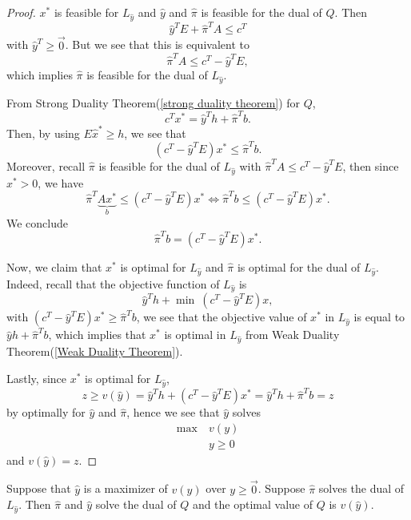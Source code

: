 \begin{proof}
	\(x^{*}\) is feasible for \(L_{\hat{y}}\) and \(\hat{y}\) and \(\hat{\pi}\) is feasible for the dual of \(Q\). Then
	\[
		\hat{y}^{T}E + \hat{\pi}^{T}A \leq c^{T}
	\]
	with \(\hat{y}^{T}\geq \vec{0}\). But we see that this is equivalent to
	\[
		\hat{\pi}^{T}A\leq c^{T} - \hat{y}^{T}E,
	\]
	which implies \(\hat{\pi}\) is feasible for the dual of \(L_{\hat{y}}\).

	From Strong Duality Theorem(\autoref{strong duality theorem}) for \(Q\),
	\[
		c^{T}x^{*} = \hat{y}^{T}h + \hat{\pi}^{T}b.
	\]
	Then, by using \(E \hat{x}^{*} \geq h\), we see that
	\[
		(c^{T} - \hat{y}^{T}E)x^{*} \leq \hat{\pi}^{T}b.
	\]
	Moreover, recall \(\hat{\pi}\) is feasible for the dual of \(L_{\hat{y}}\) with \(\hat{\pi}^{T} A \leq c^{T} - \hat{y}^{T}E\), then since \(x^{*}>0\), we have
	\[
		\hat{\pi}^{T} \underbrace{Ax^{*}}_{b} \leq (c^{T} - \hat{y}^{T}E)x^{*} \iff \hat{\pi}^{T} b \leq (c^{T} - \hat{y}^{T}E)x^{*}.
	\]
	We conclude
	\[
		\hat{\pi}^{T} b = (c^{T} - \hat{y}^{T}E)x^{*}.
	\]

	Now, we claim that \(x^{*}\) is optimal for \(L_{\hat{y}}\) and \(\hat{\pi}\) is optimal for the dual of \(L_{\hat{y}}\).
	Indeed, recall that the objective function of \(L_{\hat{y}}\) is
	\[
		\hat{y}^{T}h + \min~  (c^{T} - \hat{y}^{T}E)x,
	\]
	with \((c^{T} - \hat{y}^{T}E)x^{*} \geq \hat{\pi}^{T}b\), we see that the objective value of \(x^{*}\) in \(L_{\hat{y}}\)
	is equal to \(\hat{y}h+\hat{\pi}^{T}b \), which implies that \(x^{*}\) is optimal in \(L_{\hat{y}}\) from Weak Duality Theorem(\autoref{Weak Duality Theorem}).

	Lastly, since \(x^{*}\) is optimal for \(L_{\hat{y}}\),
	\[
		z\geq v(\hat{y})= \hat{y}^{T}h + (c^{T} - \hat{y}^{T}E)x^{*}= \hat{y}^{T}h + \hat{\pi}^{T}b = z
	\]
	by optimally for \(\hat{y}\) and \(\hat{\pi}\), hence we see that \(\hat{y}\) solves
	\begin{align*}
		\max~ & v(y)    \\
		      & y\geq 0
	\end{align*}
	and \(v(\hat{y}) = z\).
\end{proof}

\begin{theorem}
	\label{converse-lagrangian dual}
	Suppose that \(\hat{y}\) is a maximizer of \(v(y)\) over \(y\geq \vec{0}\). Suppose \(\hat{\pi}\) solves the dual of \(L_{\hat{y}}\).
	Then \(\hat{\pi}\) and \(\hat{y}\) solve the dual of \(Q\) and the optimal value of \(Q\) is \(v(\hat{y})\).
\end{theorem}

\begin{figure}[H]
	\centering
	\label{fig:lagrangian-maximizer}
\end{figure}
